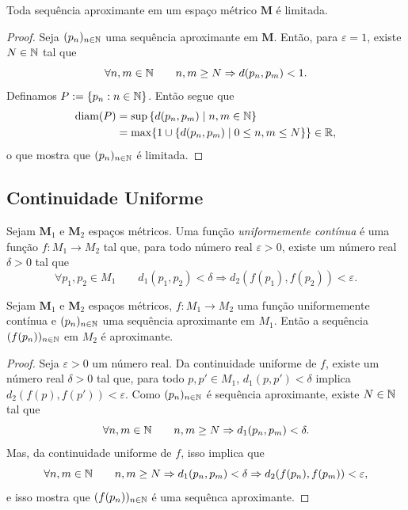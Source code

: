 \begin{prop}
Toda sequência aproximante em um espaço métrico $\bm M$ é limitada.
\end{prop}
\begin{proof}
Seja $(p_n)_{n \in \mathbb{N}}$ uma sequência aproximante em $\bm M$. Então, para $\varepsilon=1$, existe $N \in \mathbb{N}$ tal que
	\begin{equation*}
	\forall n,m \in \mathbb{N} \qquad n,m \geq N \Rightarrow d(p_n,p_m)<1.
	\end{equation*}
	Definamos $P := \{p_n : n \in \mathbb{N}\}$. Então segue que
	\begin{align*}
	\operatorname{diam}(P) &= \sup \left\{d(p_n,p_m) \;\middle\vert\; n,m \in \mathbb{N} \right\} \\
		&= \max\{1 \cup \left\{d(p_n,p_m) \;\middle\vert\; 0 \leq n,m \leq N \right\}\} \in \mathbb{R},
	\end{align*}
o que mostra que $(p_n)_{n \in \mathbb{N}}$ é limitada.
\end{proof}

\subsection{Continuidade Uniforme}

\begin{defi}
Sejam $\bm M_1$ e $\bm M_2$ espaços métricos. Uma função \emph{uniformemente contínua} é uma função $f: M_1 \to M_2$ tal que, para todo número real $\varepsilon > 0$, existe um número real $\delta > 0$ tal que
	\begin{equation*}
	\forall p_1,p_2 \in M_1 \qquad d_1(p_1,p_2) < \delta \Rightarrow d_2(f(p_1),f(p_2)) < \varepsilon.
	\end{equation*}
\end{defi}

\begin{prop}
Sejam $\bm M_1$ e $\bm M_2$ espaços métricos, $f: M_1 \to M_2$ uma função uniformemente contínua e $(p_n)_{n \in \mathbb{N}}$ uma sequência aproximante em $M_1$. Então a sequência $(f(p_n))_{n \in \mathbb{N}}$ em $M_2$ é aproximante.
\end{prop}
\begin{proof}
Seja $\varepsilon > 0$ um número real. Da continuidade uniforme de $f$, existe um número real $\delta > 0$ tal que, para todo $p,p' \in M_1$, $d_1(p,p') < \delta$ implica $d_2(f(p),f(p')) < \varepsilon$. Como $(p_n)_{n \in \mathbb{N}}$ é sequência aproximante, existe $N \in \mathbb{N}$ tal que
	\begin{equation*}
	\forall n,m \in \mathbb{N} \qquad n,m \geq N \Rightarrow d_1(p_n,p_m) < \delta.
	\end{equation*}
Mas, da continuidade uniforme de $f$, isso implica que
	\begin{equation*}
	\forall n,m \in \mathbb{N} \qquad n,m \geq N \Rightarrow d_1(p_n,p_m) < \delta  \Rightarrow d_2(f(p_n),f(p_m)) < \varepsilon,
	\end{equation*}
e isso mostra que $(f(p_n))_{n \in \mathbb{N}}$ é uma sequênca aproximante.
\end{proof}

